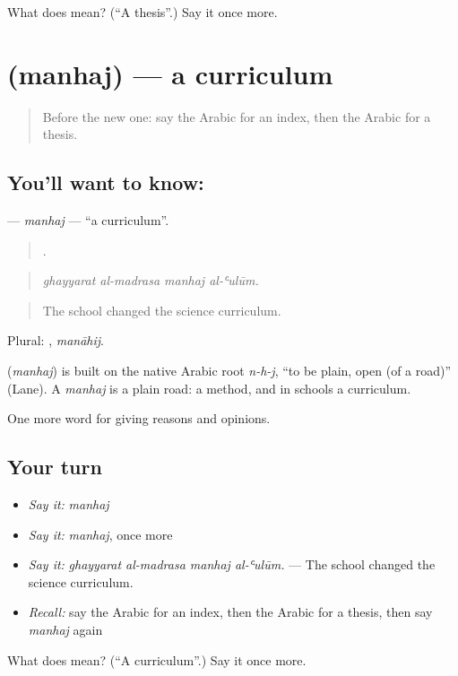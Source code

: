 \begin{tcolorbox}[breakable,colback=teal!4,colframe=teal!35!black,title={Before you move on}]
What does  mean? (\textquotedblleft{}A thesis\textquotedblright{}.) Say it once more.
\end{tcolorbox}
\section[\texorpdfstring{\ar{منهج} (manhaj)}{منهج (manhaj)}]{ (manhaj) — a curriculum}

\label{lesson:AR-C396-manhaj}



\begin{quote}
Before the new one: say the Arabic for an index, then the Arabic for a thesis.
\end{quote}

\subsection*{You'll want to know: }
\textbf{} — \emph{manhaj} — \textquotedblleft{}a curriculum\textquotedblright{}.

\begin{quote}
   .
\end{quote}

\begin{quote}
\emph{ghayyarat al-madrasa manhaj al-ʿulūm.}
\end{quote}

\begin{quote}
The school changed the science curriculum.
\end{quote}

Plural: , \emph{manāhij}.

\begin{cousinweb}
\textbf{} (\emph{manhaj}) is built on the native Arabic root \emph{n-h-j}, \textquotedblleft{}to be plain, open (of a road)\textquotedblright{} (Lane). A \emph{manhaj} is a plain road: a method, and in schools a curriculum.
\end{cousinweb}

\begin{grammarlens}[title={What you've built}]
One more word for giving reasons and opinions.
\end{grammarlens}

\subsection*{Your turn}
\begin{itemize}
\raggedright
  \item \emph{Say it:} \emph{manhaj}
  \item \emph{Say it:} \emph{manhaj}, once more
  \item \emph{Say it:} \emph{ghayyarat al-madrasa manhaj al-ʿulūm.} — The school changed the science curriculum.
  \item \emph{Recall:} say the Arabic for an index, then the Arabic for a thesis, then say \emph{manhaj} again
\end{itemize}

\begin{tcolorbox}[breakable,colback=teal!4,colframe=teal!35!black,title={Before you move on}]
What does  mean? (\textquotedblleft{}A curriculum\textquotedblright{}.) Say it once more.
\end{tcolorbox}
